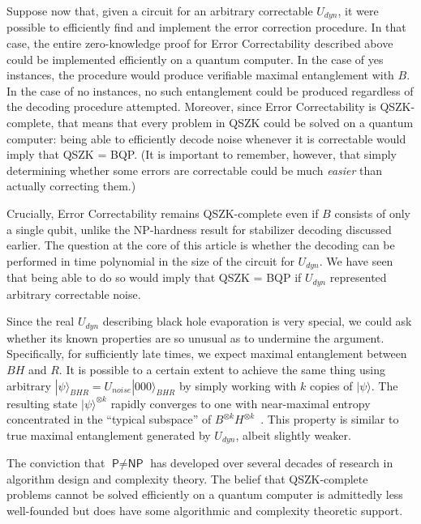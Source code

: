 \documentclass[12pt]{article}
\newcommand{\textcs}[1]{\textsf{#1}}
\newcommand{\NP}{\textcs{NP}}
\begin{document}
Suppose now that, given a circuit for an arbitrary correctable $U_{dyn}$,  it were possible to efficiently find and implement the error correction procedure. In that case, the entire zero-knowledge proof for \textcs{Error Correctability} described above could be implemented efficiently on a quantum computer. In the case of yes instances, the procedure would produce verifiable maximal entanglement with $B$. In the case of no instances, no such entanglement could be produced regardless of the decoding procedure attempted. Moreover, since Error Correctability is \textcs{QSZK}-complete, that means that every problem in \textcs{QSZK} could be solved on a quantum computer: being able to efficiently decode noise whenever it is correctable would imply that \textcs{QSZK} = \textcs{BQP}. (It is important to remember, however, that simply determining whether some errors are correctable could be much \emph{easier} than actually correcting them.)

Crucially, \textcs{Error Correctability} remains \textcs{QSZK}-complete even if $B$ consists of only a single qubit, unlike the \NP-hardness result for stabilizer decoding discussed earlier.  The question at the core of this article is whether the decoding can be performed in time polynomial in the size of the circuit for $U_{dyn}$.  We have seen that being able to do so would imply that \textcs{QSZK} = \textcs{BQP} if $U_{dyn}$ represented arbitrary correctable noise.

Since the real $U_{dyn}$ describing black hole evaporation is very special, we could ask whether its known properties are so unusual as to undermine the argument. Specifically, for sufficiently late times, we expect maximal entanglement between $BH$ and $R$. It is possible to a certain extent to achieve the same thing using arbitrary $|\psi\rangle_{BHR} = U_{noise} | 000 \rangle_{BHR}$ by simply working with $k$ copies of $|\psi\rangle$. The resulting state $|\psi\rangle^{\otimes k}$ rapidly converges to one with near-maximal entropy concentrated in the ``typical subspace'' of  $B^{\otimes k}H^{\otimes k}$~\cite{schumacher1995quantum}. This property is similar to true maximal entanglement generated by $U_{dyn}$, albeit slightly weaker. 

The conviction that $\textcs{P} \neq \NP$ has developed over several decades of research in algorithm design and complexity theory. The belief that \textcs{QSZK}-complete problems cannot be solved efficiently on a quantum computer is admittedly less well-founded but does have some algorithmic and complexity theoretic support. 
\end{document}
